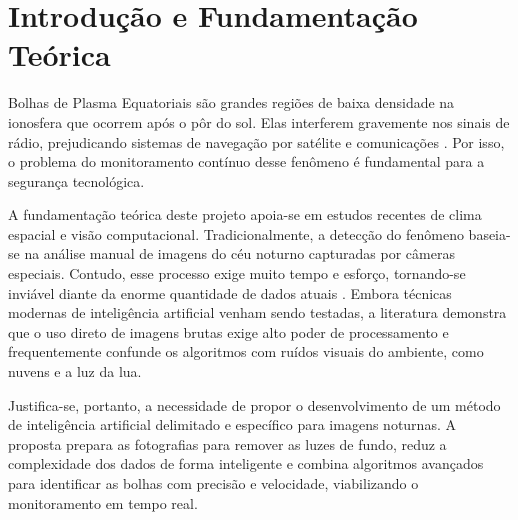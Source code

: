 \section{Introdução e Fundamentação Teórica}\label{sec:introduction}

Bolhas de Plasma Equatoriais são grandes regiões de baixa densidade na ionosfera que ocorrem após o pôr do sol. Elas interferem gravemente nos sinais de rádio, prejudicando sistemas de navegação por satélite e comunicações \cite{zhong2025automatic, okoh2025bootstrapping}. Por isso, o problema do monitoramento contínuo desse fenômeno é fundamental para a segurança tecnológica.

A fundamentação teórica deste projeto apoia-se em estudos recentes de clima espacial e visão computacional. Tradicionalmente, a detecção do fenômeno baseia-se na análise manual de imagens do céu noturno capturadas por câmeras especiais. Contudo, esse processo exige muito tempo e esforço, tornando-se inviável diante da enorme quantidade de dados atuais \cite{githio2024machine}. Embora técnicas modernas de inteligência artificial venham sendo testadas, a literatura demonstra que o uso direto de imagens brutas exige alto poder de processamento e frequentemente confunde os algoritmos com ruídos visuais do ambiente, como nuvens e a luz da lua.

Justifica-se, portanto, a necessidade de propor o desenvolvimento de um método de inteligência artificial delimitado e específico para imagens noturnas. A proposta prepara as fotografias para remover as luzes de fundo, reduz a complexidade dos dados de forma inteligente e combina algoritmos avançados para identificar as bolhas com precisão e velocidade, viabilizando o monitoramento em tempo real.